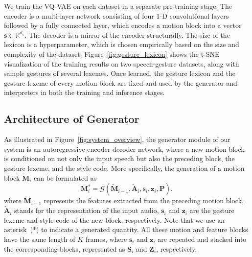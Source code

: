 \documentclass[acmtog,authorversion]{acmart}
\newcommand{\vect}[1]{\bm{#1}}
\newcommand{\tildevect}[1]{\vect{\tilde{#1}}}
\newcommand{\fig}{Figure{}~}
\begin{document}
We train the VQ-VAE on each dataset in a separate pre-training stage. The encoder is a multi-layer network consisting of four 1-D convolutional layers followed by a fully connected layer, which encodes a motion block into a vector $\vect{s}\in\mathbb{R}^{d_s}$. The decoder is a mirror of the encoder structurally. The size of the lexicon is a hyperparameter, which is chosen empirically based on the size and complexity of the dataset. \fig\ref{fig:gesture_lexicon} shows the t-SNE visualization of the training results on two speech-gesture datasets, along with sample gestures of several lexemes. Once learned, the gesture lexicon and the gesture lexeme of every motion block are fixed and used by the generator and interpreters in both the training and inference stages.

\subsection{Architecture of Generator}
As illustrated in \fig\ref{fig:system_overview}, the generator module of our system is an autoregressive encoder-decoder network, where a new motion block is conditioned on not only the input speech but also the preceding block, the gesture lexeme, and the style code. More specifically, the generation of a motion block $\vect{M}_{i}$ can be formulated as
\begin{equation}
    \vect{M}_{i}^*=\mathcal{G}(\tildevect{M}_{i-1},\tildevect{A}_{i},\vect{s}_i,\vect{z}_i,\vect{P}) \label{eqn:generator_block},
\end{equation}
where $\tildevect{M}_{i-1}$ represents the features extracted from the preceding motion block, $\tildevect{A}_{i}$ stands for the representation of the input audio, $\vect{s}_i$ and $\vect{z}_i$ are the gesture lexeme and style code of the new block, respectively. Note that we use an asterisk~($*$) to indicate a generated quantity. All these motion and feature blocks have the same length of $K$ frames, where $\vect{s}_i$ and $\vect{z}_i$ are repeated and stacked into the corresponding blocks, represented as $\vect{S}_i$ and $\vect{Z}_i$, respectively.
\end{document}
